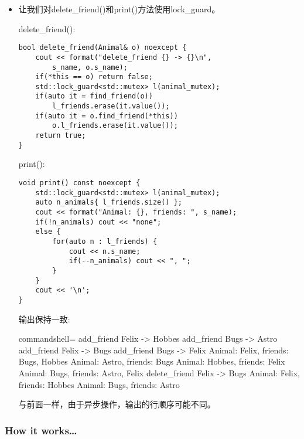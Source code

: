 \begin{itemize}
\begin{lstlisting}[style=styleCXX]
bool add_friend(Animal& o) noexcept {
	cout << format("add_friend {} -> {}\n", s_name, o.s_
		name);
	if(*this == o) return false;
	std::lock_guard<std::mutex> l(animal_mutex);
	if(!is_friend(o)) l_friends.emplace_back(o);
	if(!o.is_friend(*this))
		o.l_friends.emplace_back(*this);
	return true;
}
\end{lstlisting}

lock\_guard对象创建并持有一个锁，直到它销毁。和lock()方法一样，lock\_guard也会阻塞至有锁可用为止。

\item 
让我们对delete\_friend()和print()方法使用lock\_guard。

delete\_friend():

\begin{lstlisting}[style=styleCXX]
bool delete_friend(Animal& o) noexcept {
	cout << format("delete_friend {} -> {}\n",
		s_name, o.s_name);
	if(*this == o) return false;
	std::lock_guard<std::mutex> l(animal_mutex);
	if(auto it = find_friend(o))
		l_friends.erase(it.value());
	if(auto it = o.find_friend(*this))
		o.l_friends.erase(it.value());
	return true;
}
\end{lstlisting}

print():

\begin{lstlisting}[style=styleCXX]
void print() const noexcept {
	std::lock_guard<std::mutex> l(animal_mutex);
	auto n_animals{ l_friends.size() };
	cout << format("Animal: {}, friends: ", s_name);
	if(!n_animals) cout << "none";
	else {
		for(auto n : l_friends) {
			cout << n.s_name;
			if(--n_animals) cout << ", ";
		}
	}
	cout << '\n';
}
\end{lstlisting}

输出保持一致:

\begin{tcblisting}{commandshell={}}
add_friend Felix -> Hobbes
add_friend Bugs -> Astro
add_friend Felix -> Bugs
add_friend Bugs -> Felix
Animal: Felix, friends: Bugs, Hobbes
Animal: Astro, friends: Bugs
Animal: Hobbes, friends: Felix
Animal: Bugs, friends: Astro, Felix
delete_friend Felix -> Bugs
Animal: Felix, friends: Hobbes
Animal: Bugs, friends: Astro
\end{tcblisting}

与前面一样，由于异步操作，输出的行顺序可能不同。

\end{itemize}

\subsubsection{How it works…}

